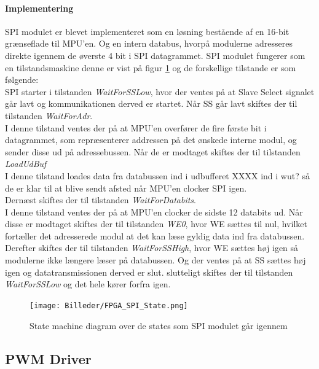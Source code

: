 \paragraph*{Implementering}
SPI modulet er blevet implementeret som en løsning bestående af en 16-bit grænseflade til MPU'en. Og en intern databus, hvorpå modulerne adresseres direkte igennem de øverste 4 bit i SPI datagrammet. SPI modulet fungerer som en tilstandsmaskine denne er vist på figur \ref{fig:FPGA_SPI_State} og de forskellige tilstande er som følgende:\\
SPI starter i tilstanden \textit{WaitForSSLow}, hvor der ventes på at Slave Select signalet går lavt og kommunikationen derved er startet. Når SS går lavt skiftes der til tilstanden \textit{WaitForAdr}. \\ 
I denne tilstand ventes der på at MPU'en overfører de fire første bit i datagrammet, som repræsenterer addressen på det ønskede interne modul, og sender disse ud på adressebussen. Når de er modtaget skiftes der til tilstanden \textit{LoadUdBuf} \\
I denne tilstand loades data fra databussen ind i udbufferet XXXX ind i wut? så de er klar til at blive sendt afsted når MPU'en clocker SPI igen.\\
Dernæst skiftes der til tilstanden \textit{WaitForDatabits}. \\
I denne tilstand ventes der på at MPU'en clocker de sidste 12 databits ud. Når disse er modtaget skiftes der til tilstanden \textit{WE0}, hvor WE sættes til nul, hvilket fortæller det adresserede modul at det kan læse gyldig data ind fra databussen. \\ Derefter skiftes der til tilstanden \textit{WaitForSSHigh}, hvor WE sættes høj igen så modulerne ikke længere læser på databussen. Og der ventes på at SS sættes høj igen og datatransmissionen derved er slut. slutteligt skiftes der til tilstanden \textit{WaitForSSLow} og det hele kører forfra igen.

\begin{figure}[ht]
	\begin{center}
		\texttt{[image: Billeder/FPGA\_SPI\_State.png]}
	\end{center}
\caption{State machine diagram over de states som SPI modulet går igennem}
\label{fig:FPGA_SPI_State}
\end{figure}

\subsection{PWM Driver}

